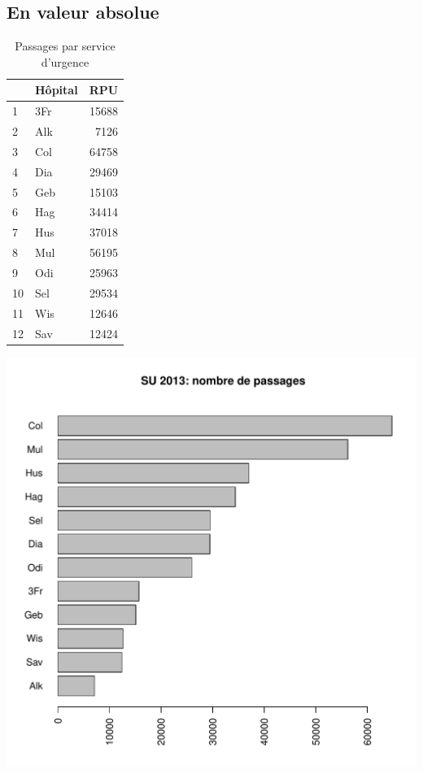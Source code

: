 \documentclass[12pt,english,french,twoside]{book}\usepackage[]{graphicx}\usepackage[]{color}
\makeatletter
\def\maxwidth{ %
  \ifdim\Gin@nat@width>\linewidth
    \linewidth
  \else
    \Gin@nat@width
  \fi
}
\makeatother
\begin{document}
\subsection*{En valeur absolue}

\begin{table}[ht]
\centering
\begin{tabular}{llr}
  \hline
 & Hôpital & RPU \\ 
  \hline
1 & 3Fr & 15688 \\ 
  2 & Alk & 7126 \\ 
  3 & Col & 64758 \\ 
  4 & Dia & 29469 \\ 
  5 & Geb & 15103 \\ 
  6 & Hag & 34414 \\ 
  7 & Hus & 37018 \\ 
  8 & Mul & 56195 \\ 
  9 & Odi & 25963 \\ 
  10 & Sel & 29534 \\ 
  11 & Wis & 12646 \\ 
  12 & Sav & 12424 \\ 
   \hline
\end{tabular}
\caption[Nombre de passages par service d'urgence]{Passages par service d'urgence} 
\label{fig:passage_su}
\end{table}

\includegraphics[width=\maxwidth]{figure/val_abs} 
\end{document}
